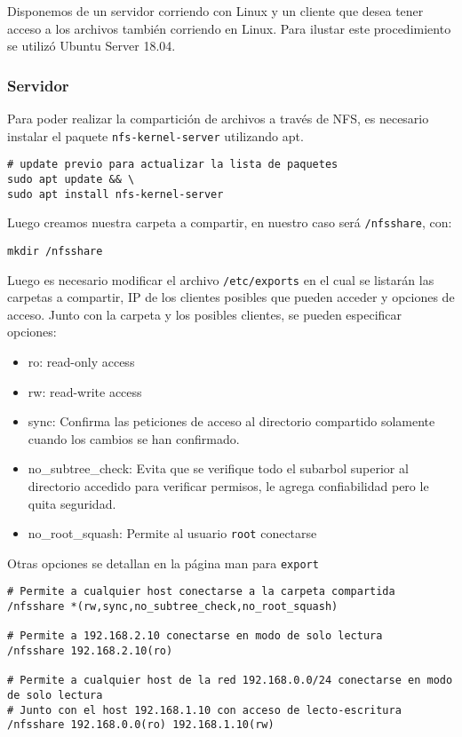 Disponemos de un servidor corriendo con Linux y un cliente que desea tener acceso a los archivos también corriendo en Linux. Para ilustar este procedimiento se utilizó Ubuntu Server 18.04.

\subsubsection{Servidor}

Para poder realizar la compartición de archivos a través de NFS, es necesario instalar el paquete \texttt{nfs-kernel-server} utilizando apt.

\begin{lstlisting}
# update previo para actualizar la lista de paquetes
sudo apt update && \
sudo apt install nfs-kernel-server
\end{lstlisting}

Luego creamos nuestra carpeta a compartir, en nuestro caso será \texttt{/nfsshare}, con:

\begin{lstlisting}
mkdir /nfsshare
\end{lstlisting}

Luego es necesario modificar el archivo \texttt{/etc/exports} en el cual se listarán las carpetas a compartir, IP de los clientes posibles que pueden acceder y opciones de acceso. Junto con la carpeta y los posibles clientes, se pueden especificar opciones:

\begin{itemize}
    \item ro: read-only access
    \item rw: read-write access
    \item sync: Confirma las peticiones de acceso al directorio compartido solamente cuando los cambios se han confirmado.
    \item no\_subtree\_check: Evita que se verifique todo el subarbol superior al directorio accedido para verificar permisos, le agrega confiabilidad pero le quita seguridad. 
    \item no\_root\_squash: Permite al usuario \texttt{root} conectarse
\end{itemize}

    Otras opciones se detallan en la página man para \texttt{export} 

\begin{lstlisting}
# Permite a cualquier host conectarse a la carpeta compartida
/nfsshare *(rw,sync,no_subtree_check,no_root_squash)

# Permite a 192.168.2.10 conectarse en modo de solo lectura
/nfsshare 192.168.2.10(ro)

# Permite a cualquier host de la red 192.168.0.0/24 conectarse en modo de solo lectura
# Junto con el host 192.168.1.10 con acceso de lecto-escritura
/nfsshare 192.168.0.0(ro) 192.168.1.10(rw)
\end{lstlisting}

